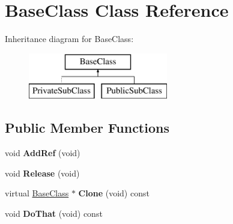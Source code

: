 \hypertarget{classBaseClass}{}\section{Base\+Class Class Reference}
\label{classBaseClass}
Inheritance diagram for Base\+Class\+:\begin{figure}[H]
\begin{center}
\leavevmode
\includegraphics[height=2.000000cm]{classBaseClass}
\end{center}
\end{figure}
\subsection*{Public Member Functions}
\begin{DoxyCompactItemize}
\item 
\hypertarget{classBaseClass_acaa1998ab6387fc7ef2bf65032d13661}{}void {\bfseries Add\+Ref} (void)\label{classBaseClass_acaa1998ab6387fc7ef2bf65032d13661}

\item 
\hypertarget{classBaseClass_a19e3e0a9b366126123658d5638cf01e5}{}void {\bfseries Release} (void)\label{classBaseClass_a19e3e0a9b366126123658d5638cf01e5}

\item 
\hypertarget{classBaseClass_add74d08ce933755f9e5e394187036680}{}virtual \hyperlink{classBaseClass}{Base\+Class} $\ast$ {\bfseries Clone} (void) const \label{classBaseClass_add74d08ce933755f9e5e394187036680}

\item 
\hypertarget{classBaseClass_a6dc1f5be2414c6fa29594d0b6f0c10f4}{}void {\bfseries Do\+That} (void) const \label{classBaseClass_a6dc1f5be2414c6fa29594d0b6f0c10f4}

\end{DoxyCompactItemize}
